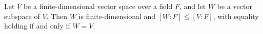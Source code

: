 Let $V$ be a finite-dimensional vector space over a field $F$, and let $W$ be a vector subspace of $V$. Then $W$ is finite-dimensional and $[W:F] \leq [V:F]$, with equality holding if and only if $W = V$.
